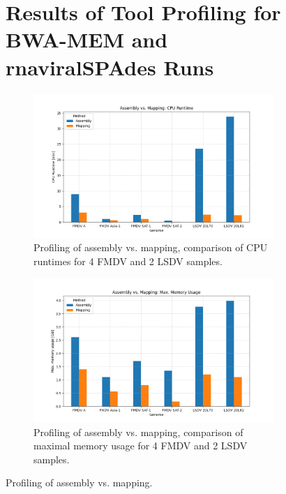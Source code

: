 \begin{figure}[ht!]
	\section*{\thesection \quad Results of Tool Profiling for BWA-MEM and rnaviralSPAdes Runs}
    \centering
	\begin{subfigure}[b]{1.0\textwidth}
        \includegraphics[width=1.0\textwidth]{media/4-profiling-cputime.png}
        \caption{Profiling of assembly vs. mapping, comparison of CPU runtimes for 4 FMDV and 2 LSDV samples.}
        \label{fig:4-profiling-cpu}
    \end{subfigure}
	\begin{subfigure}[b]{1.0\textwidth}
        \includegraphics[width=1.0\textwidth]{media/4-profiling-maxmem.png}
        \caption{Profiling of assembly vs. mapping, comparison of maximal memory usage for 4 FMDV and 2 LSDV samples.}
        \label{fig:4-profiling-mem}
    \end{subfigure}
    \caption{Profiling of assembly vs. mapping.}
\end{figure}
